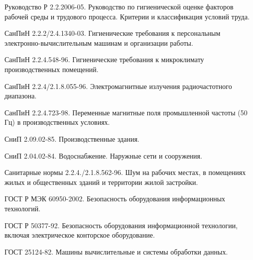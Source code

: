    Руководство Р 2.2.2006-05.
                                    Руководство по гигиенической оценке факторов
                                    рабочей среды и трудового процесса. Критерии
                                    и классификация условий труда.

    СанПиН 2.2.2/2.4.1340-03.
                                    Гигиенические требования к персональным
                                    электронно-вычислительным машинам и
                                    организации работы.

     СанПиН 2.2.4.548-96.
                                    Гигиенические требования к микроклимату
                                    производственных помещений.

     СанПиН 2.2.4/2.1.8.055-96.
                                    Электромагнитные излучения радиочастотного
                                    диапазона.

     СанПиН 2.2.4.723-98.
                                    Переменные магнитные поля промышленной
                                    частоты (50 Гц) в производственных условиях.

    СниП 2.09.02-85.
                                Производственные здания.

    СниП 2.04.02-84.
                                Водоснабжение.
                                Наружные сети и сооружения.

  Санитарные нормы 2.2.4./2.1.8.562-96.
                                        Шум на рабочих местах, в помещениях
                                        жилых и общественных зданий и
                                        территории жилой застройки.

   ГОСТ Р МЭК 60950-2002.
                                    Безопасность оборудования информационных
                                    технологий.

 ГОСТ Р 50377-92.
                                Безопасность оборудования информационной
                                технологии, включая электрическое конторское
                                оборудование.

 ГОСТ 25124-82.
                                Машины вычислительные и системы обработки данных.


